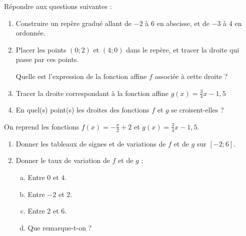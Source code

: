 \documentclass{beamer}
\begin{document}
\begin{frame}
	Répondre aux questions suivantes :
	\begin{enumerate}
		\item Construire un repère gradué allant de $-2$ à $6$ en abscisse, et de $-3$ à $4$ en ordonnée.
		\item Placer les points $(0 ; 2)$ et $(4 ; 0)$ dans le repère, et tracer la droite qui passe par ces points.

		      Quelle est l'expression de la fonction affine $f$ associée à cette droite ?
		\item Tracer la droite correspondant à la fonction affine $g(x) = \frac{3}{4}x - 1,5$
		\item En quel(s) point(s) les droites des fonctions $f$ et $g$ se croisent-elles ?
	\end{enumerate}
\end{frame}

\begin{frame}
	On reprend les fonctions $f(x) = -\frac{x}{2} + 2$ et $g(x) = \frac{3}{4}x - 1,5$.

	\begin{enumerate}
		\item Donner les tableaux de signes et de variations de $f$ et de $g$ sur $[-2 ; 6]$.
		\item Donner le taux de variation de $f$ et de $g$ :
		      \begin{enumerate}[a.]
			      \item Entre $0$ et $4$.
			      \item Entre $-2$ et $2$.
			      \item Entre $2$ et $6$.
			      \item Que remarque-t-on ?
		      \end{enumerate}
	\end{enumerate}
\end{frame}

\begin{frame}
	\begin{center}
	\end{center}
\end{frame}
\end{document}
